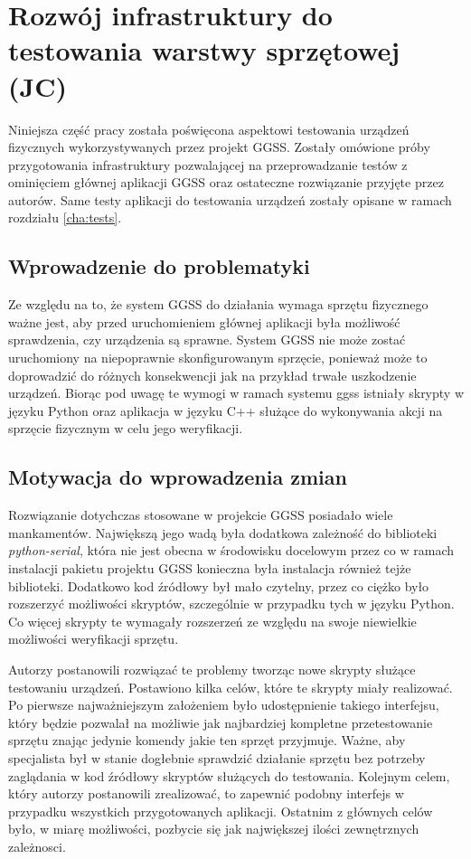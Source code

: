 \clearpage
\section{Rozwój infrastruktury do testowania warstwy sprzętowej (JC)}
\label{ch:hardware_testing}

Niniejsza część pracy została poświęcona aspektowi testowania urządzeń fizycznych wykorzystywanych przez projekt GGSS. Zostały omówione próby przygotowania infrastruktury pozwalającej na przeprowadzanie testów z ominięciem głównej aplikacji GGSS oraz ostateczne rozwiązanie przyjęte przez autorów. Same testy aplikacji do testowania urządzeń zostały opisane w ramach rozdziału \ref{cha:tests}.

\subsection{Wprowadzenie do problematyki}

Ze względu na to, że system GGSS do działania wymaga sprzętu fizycznego ważne jest, aby przed uruchomieniem głównej aplikacji była możliwość sprawdzenia, czy urządzenia są sprawne. System GGSS nie może zostać uruchomiony na niepoprawnie skonfigurowanym sprzęcie, ponieważ może to doprowadzić do różnych konsekwencji jak na przykład trwałe uszkodzenie urządzeń. Biorąc pod uwagę te wymogi w ramach systemu ggss istniały skrypty w języku Python oraz aplikacja w języku C++ służące do wykonywania akcji na sprzęcie fizycznym w celu jego weryfikacji.

\subsection{Motywacja do wprowadzenia zmian}

Rozwiązanie dotychczas stosowane w projekcie GGSS posiadało wiele mankamentów. Największą jego wadą była dodatkowa zależność do biblioteki \emph{python-serial}, która nie jest obecna w środowisku docelowym przez co w ramach instalacji pakietu projektu GGSS konieczna była instalacja również tejże biblioteki. Dodatkowo kod źródłowy był mało czytelny, przez co ciężko było rozszerzyć możliwości skryptów, szczególnie w przypadku tych w języku Python. Co więcej skrypty te wymagały rozszerzeń ze względu na swoje niewielkie możliwości weryfikacji sprzętu.

Autorzy postanowili rozwiązać te problemy tworząc nowe skrypty służące testowaniu urządzeń. Postawiono kilka celów, które te skrypty miały realizować. Po pierwsze najważniejszym założeniem było udostępnienie takiego interfejsu, który będzie pozwalał na możliwie jak najbardziej kompletne przetestowanie sprzętu znając jedynie komendy jakie ten sprzęt przyjmuje. Ważne, aby specjalista był w stanie dogłebnie sprawdzić działanie sprzętu bez potrzeby zaglądania w kod źródłowy skryptów służących do testowania. Kolejnym celem, który autorzy postanowili zrealizować, to zapewnić podobny interfejs w przypadku wszystkich przygotowanych aplikacji. Ostatnim z głównych celów było, w miarę możliwości, pozbycie się jak największej ilości zewnętrznych zależnosci.


